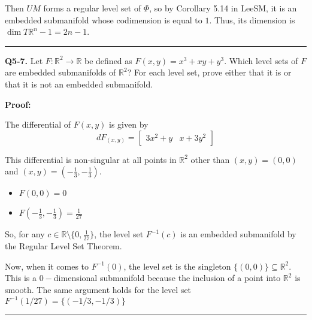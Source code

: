 \documentclass{article}
\newcommand{\R}{\mathbb{R}}
\begin{document}
Then $UM$ forms a regular level set of $\Phi$, so by Corollary 5.14 in LeeSM, it is an embedded submanifold whose codimension is equal to $1$. Thus, its dimension is $\dim T\R^n - 1 = 2n - 1$.

\vskip 0.5cm
\hrule 
\vskip 0.5cm




\textbf{Q5-7.} Let $F : \R^2 \rightarrow \R$ be defined as $F(x,y) = x^3 + xy + y^3$. Which level sets of $F$ are embedded submanifolds of $\R^2$? For each level set, prove either that it is or that it is not an embedded submanifold. 

\vskip 0.5cm
\textbf{Proof:}

The differential of $F(x,y)$ is given by 
\[ dF_{(x,y)} = \begin{bmatrix}
  3x^2 + y & x + 3y^2
\end{bmatrix} \]

This differential is non-singular at all points in $\R^2$ other than $(x,y) = (0,0)$ and $(x,y) = \left(-\frac{1}{3}, -\frac{1}{3}\right)$.


\vskip 0.5cm
\begin{itemize}
  \item $F(0, 0) = 0$
  \item $F\left(-\frac{1}{3}, -\frac{1}{3}\right) = \frac{1}{27}$
\end{itemize}

\vskip 0.5cm
So, for any $c \in \R \setminus \{0, \frac{1}{27}\}$, the level set $F^{-1}(c)$ is an embedded submanifold by the Regular Level Set Theorem.

\vskip 0.5cm
Now, when it comes to $F^{-1}(0)$, the level set is the singleton $\{(0,0)\} \subseteq \R^2$. This is a $0-$dimensional submanifold because the inclusion of a point into $\R^2$ is smooth. The same argument holds for the level set $F^{-1}(1/27) = \{\left(-1/3, -1/3\right)\}$



\vskip 0.5cm
\hrule 
\vskip 0.5cm









\end{document}
